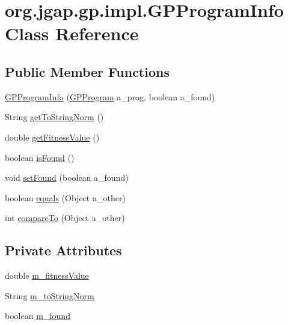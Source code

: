 \hypertarget{classorg_1_1jgap_1_1gp_1_1impl_1_1_g_p_program_info}{\section{org.\-jgap.\-gp.\-impl.\-G\-P\-Program\-Info Class Reference}
\label{classorg_1_1jgap_1_1gp_1_1impl_1_1_g_p_program_info}
}
\subsection*{Public Member Functions}
\begin{DoxyCompactItemize}
\item 
\hyperlink{classorg_1_1jgap_1_1gp_1_1impl_1_1_g_p_program_info_a1575920458eab4f8d3fed1e0f4b726ac}{G\-P\-Program\-Info} (\hyperlink{classorg_1_1jgap_1_1gp_1_1impl_1_1_g_p_program}{G\-P\-Program} a\-\_\-prog, boolean a\-\_\-found)
\item 
String \hyperlink{classorg_1_1jgap_1_1gp_1_1impl_1_1_g_p_program_info_afb086b1a0b503aa91af0e92a6c5f58a6}{get\-To\-String\-Norm} ()
\item 
double \hyperlink{classorg_1_1jgap_1_1gp_1_1impl_1_1_g_p_program_info_ab7d61f972085fca4763526b988daad54}{get\-Fitness\-Value} ()
\item 
boolean \hyperlink{classorg_1_1jgap_1_1gp_1_1impl_1_1_g_p_program_info_abfe092577df87bfdad6ca9a72bb64db7}{is\-Found} ()
\item 
void \hyperlink{classorg_1_1jgap_1_1gp_1_1impl_1_1_g_p_program_info_a86e1f4ac0bd34cbde3e5a90ace064842}{set\-Found} (boolean a\-\_\-found)
\item 
boolean \hyperlink{classorg_1_1jgap_1_1gp_1_1impl_1_1_g_p_program_info_a52f4f5e6e87bb7e57bc96871912da62f}{equals} (Object a\-\_\-other)
\item 
int \hyperlink{classorg_1_1jgap_1_1gp_1_1impl_1_1_g_p_program_info_ab85d38dfc92a36cf0131042ed09c72bc}{compare\-To} (Object a\-\_\-other)
\end{DoxyCompactItemize}
\subsection*{Private Attributes}
\begin{DoxyCompactItemize}
\item 
double \hyperlink{classorg_1_1jgap_1_1gp_1_1impl_1_1_g_p_program_info_aae643f2a3dc53c6264935548d4d93e41}{m\-\_\-fitness\-Value}
\item 
String \hyperlink{classorg_1_1jgap_1_1gp_1_1impl_1_1_g_p_program_info_adb57872b6a7ea2938b8883de2b529b47}{m\-\_\-to\-String\-Norm}
\item 
boolean \hyperlink{classorg_1_1jgap_1_1gp_1_1impl_1_1_g_p_program_info_ae280cb35b66e8c6cbff5c7440a51afc5}{m\-\_\-found}
\end{DoxyCompactItemize}
